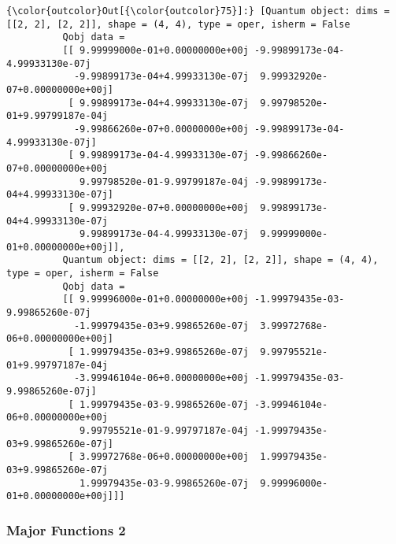 \documentclass[11pt]{article}
\begin{document}
\begin{Verbatim}[commandchars=\\\{\}]
{\color{outcolor}Out[{\color{outcolor}75}]:} [Quantum object: dims = [[2, 2], [2, 2]], shape = (4, 4), type = oper, isherm = False
          Qobj data =
          [[ 9.99999000e-01+0.00000000e+00j -9.99899173e-04-4.99933130e-07j
            -9.99899173e-04+4.99933130e-07j  9.99932920e-07+0.00000000e+00j]
           [ 9.99899173e-04+4.99933130e-07j  9.99798520e-01+9.99799187e-04j
            -9.99866260e-07+0.00000000e+00j -9.99899173e-04-4.99933130e-07j]
           [ 9.99899173e-04-4.99933130e-07j -9.99866260e-07+0.00000000e+00j
             9.99798520e-01-9.99799187e-04j -9.99899173e-04+4.99933130e-07j]
           [ 9.99932920e-07+0.00000000e+00j  9.99899173e-04+4.99933130e-07j
             9.99899173e-04-4.99933130e-07j  9.99999000e-01+0.00000000e+00j]],
          Quantum object: dims = [[2, 2], [2, 2]], shape = (4, 4), type = oper, isherm = False
          Qobj data =
          [[ 9.99996000e-01+0.00000000e+00j -1.99979435e-03-9.99865260e-07j
            -1.99979435e-03+9.99865260e-07j  3.99972768e-06+0.00000000e+00j]
           [ 1.99979435e-03+9.99865260e-07j  9.99795521e-01+9.99797187e-04j
            -3.99946104e-06+0.00000000e+00j -1.99979435e-03-9.99865260e-07j]
           [ 1.99979435e-03-9.99865260e-07j -3.99946104e-06+0.00000000e+00j
             9.99795521e-01-9.99797187e-04j -1.99979435e-03+9.99865260e-07j]
           [ 3.99972768e-06+0.00000000e+00j  1.99979435e-03+9.99865260e-07j
             1.99979435e-03-9.99865260e-07j  9.99996000e-01+0.00000000e+00j]]]
\end{Verbatim}
            
    \subsubsection{Major Functions 2}\label{major-functions-2}
\end{document}
